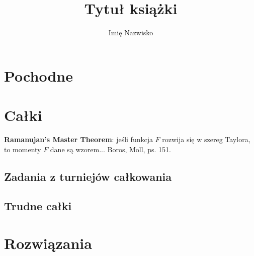 \documentclass[9pt, twoside, a5paper, fleqn]{extbook}
\author{Imię Nazwisko}
\title{Tytuł książki}
\theoremstyle{remark}
\begin{document}






\raggedbottom

\chapter{Pochodne}


\chapter{Całki}








\textbf{Ramanujan's Master Theorem}: jeśli funkcja $F$ rozwija się w szereg Taylora, to momenty $F$ dane są wzorem... Boros, Moll, ps. 151.


	

\section{Zadania z turniejów całkowania}
	



\section{Trudne całki}
	
	
	

\chapter{Rozwiązania}
% 





% 

\end{document}
